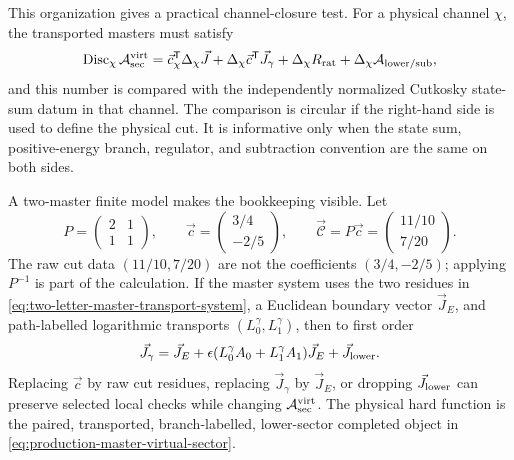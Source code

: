 \begin{controlledapproximation}
This organization gives a practical channel-closure test.  For a physical
channel \(\chi\), the transported masters must satisfy
\begin{equation}
  \operatorname{Disc}_{\chi}\mathcal A_{\rm sec}^{\rm virt}
  =
  \vec c_\chi^{\mathsf T}\Delta_\chi\vec J
  +\Delta_\chi\vec c^{\mathsf T}\vec J_\gamma
  +\Delta_\chi R_{\rm rat}
  +\Delta_\chi \mathcal A_{\rm lower/sub},
  \label{eq:production-master-channel-closure}
\end{equation}
and this number is compared with the independently normalized Cutkosky
state-sum datum in that channel.  The comparison is circular if the right-hand
side is used to define the physical cut.  It is informative only when the
state sum, positive-energy branch, regulator, and subtraction convention are
the same on both sides.

A two-master finite model makes the bookkeeping visible.  Let
\[
  P=\begin{pmatrix}2&1\\1&1\end{pmatrix},
  \qquad
  \vec c=
  \begin{pmatrix}3/4\\-2/5\end{pmatrix},
  \qquad
  \vec{\mathcal C}=P\vec c=
  \begin{pmatrix}11/10\\7/20\end{pmatrix}.
\]
The raw cut data \((11/10,7/20)\) are not the coefficients
\((3/4,-2/5)\); applying \(P^{-1}\) is part of the calculation.  If the
master system uses the two residues in
\eqref{eq:two-letter-master-transport-system}, a Euclidean boundary vector
\(\vec J_E\), and path-labelled logarithmic transports
\((L_0^\gamma,L_1^\gamma)\), then to first order
\[
  \vec J_\gamma
  =
  \vec J_E
  +\epsilon(L_0^\gamma A_0+L_1^\gamma A_1)\vec J_E
  +\vec J_{\rm lower}.
\]
Replacing \(\vec c\) by raw cut residues, replacing \(\vec J_\gamma\) by
\(\vec J_E\), or dropping \(\vec J_{\rm lower}\) can preserve selected local
checks while changing \(\mathcal A_{\rm sec}^{\rm virt}\).  The physical
hard function is the paired, transported, branch-labelled, lower-sector
completed object in \eqref{eq:production-master-virtual-sector}.


\end{controlledapproximation}
